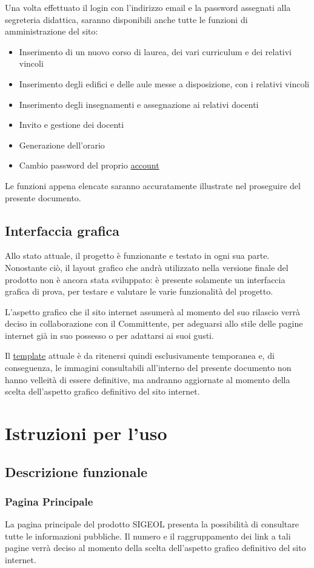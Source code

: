 \documentclass[11pt,a4paper]{article}
\begin{document}
\bigskip
Una volta effettuato il login con l'indirizzo email e la password assegnati alla segreteria didattica, saranno disponibili anche tutte le funzioni di amministrazione del sito:
\begin{itemize}
 \item Inserimento di un nuovo corso di laurea, dei vari curriculum e dei relativi vincoli
 \item Inserimento degli edifici e delle aule messe a disposizione, con i relativi vincoli
 \item Inserimento degli insegnamenti e assegnazione ai relativi docenti
 \item Invito e gestione dei docenti
 \item Generazione dell'orario
 \item Cambio password del proprio \underline{account}
\end{itemize}
Le funzioni appena elencate saranno accuratamente illustrate nel proseguire del presente documento.
\subsection{Interfaccia grafica}
Allo stato attuale, il progetto è funzionante e testato in ogni sua parte.
Nonostante ciò, il layout grafico che andrà utilizzato nella versione finale del prodotto non è ancora stata sviluppato: è presente solamente un interfaccia grafica di prova, per testare e valutare le varie funzionalità del progetto.

L'aspetto grafico che il sito internet assumerà al momento del suo rilascio verrà deciso in collaborazione con il Committente, per adeguarsi allo stile delle pagine internet già in suo possesso o per adattarsi ai suoi gusti.

Il \underline{template} attuale è da ritenersi quindi esclusivamente temporanea e, di conseguenza, le immagini consultabili all'interno del presente documento non hanno velleità di essere definitive, ma andranno aggiornate al momento della scelta dell'aspetto grafico definitivo del sito internet.
\section{Istruzioni per l'uso}
\subsection{Descrizione funzionale}
\subsubsection{Pagina Principale}
La pagina principale del prodotto SIGEOL presenta la possibilità di consultare tutte le informazioni pubbliche. Il numero e il raggruppamento dei link a tali pagine verrà deciso al momento della scelta dell'aspetto grafico definitivo del sito internet.
\end{document}
